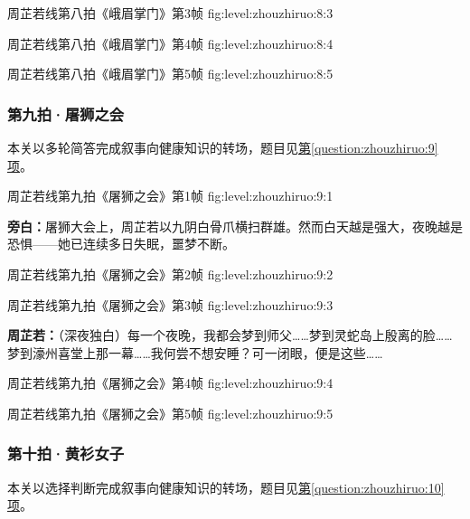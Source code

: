   {周芷若线第八拍《峨眉掌门》第3帧}
  {fig:level:zhouzhiruo:8:3}
  {\scriptsize}
  {\mbox{}}

  {周芷若线第八拍《峨眉掌门》第4帧}
  {fig:level:zhouzhiruo:8:4}
  {\scriptsize}
  {\mbox{}}

\clearpage

  {周芷若线第八拍《峨眉掌门》第5帧}
  {fig:level:zhouzhiruo:8:5}
  {\scriptsize}
  {\mbox{}}

\subsubsection{第九拍·屠狮之会}\label{plot:zhouzhiruo:9}
本关以多轮简答完成叙事向健康知识的转场，题目见\hyperref[question:zhouzhiruo:9]{第\ref*{question:zhouzhiruo:9}项}。

  {周芷若线第九拍《屠狮之会》第1帧}
  {fig:level:zhouzhiruo:9:1}
  {\scriptsize}
  {\textbf{旁白：}屠狮大会上，周芷若以九阴白骨爪横扫群雄。然而白天越是强大，夜晚越是恐惧——她已连续多日失眠，噩梦不断。\par}

  {周芷若线第九拍《屠狮之会》第2帧}
  {fig:level:zhouzhiruo:9:2}
  {\scriptsize}
  {\mbox{}}

\clearpage

  {周芷若线第九拍《屠狮之会》第3帧}
  {fig:level:zhouzhiruo:9:3}
  {\scriptsize}
  {\textbf{周芷若：}（深夜独白）每一个夜晚，我都会梦到师父……梦到灵蛇岛上殷离的脸……梦到濠州喜堂上那一幕……我何尝不想安睡？可一闭眼，便是这些……\par}

  {周芷若线第九拍《屠狮之会》第4帧}
  {fig:level:zhouzhiruo:9:4}
  {\scriptsize}
  {\mbox{}}

  {周芷若线第九拍《屠狮之会》第5帧}
  {fig:level:zhouzhiruo:9:5}
  {\scriptsize}
  {\mbox{}}

\clearpage

\subsubsection{第十拍·黄衫女子}\label{plot:zhouzhiruo:10}
本关以选择判断完成叙事向健康知识的转场，题目见\hyperref[question:zhouzhiruo:10]{第\ref*{question:zhouzhiruo:10}项}。

